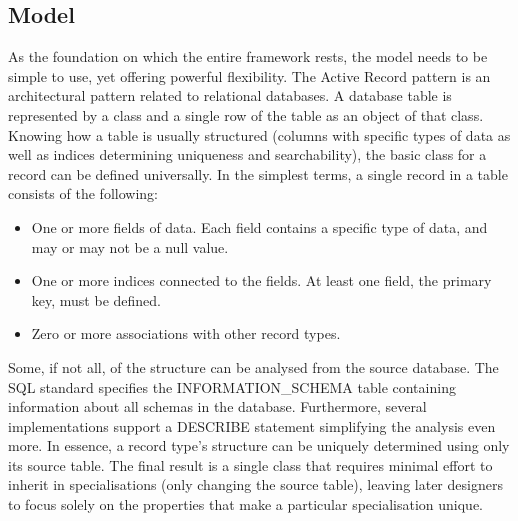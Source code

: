 
\subsection{Model}
\label{design_tech_model}
As the foundation on which the entire framework rests, the model needs to be simple to use, yet offering powerful flexibility. The Active Record pattern is an architectural pattern related to relational databases. A database table is represented by a class and a single row of the table as an object of that class. Knowing how a table is usually structured (columns with specific types of data as well as indices determining uniqueness and searchability), the basic class for a record can be defined universally.
In the simplest terms, a single record in a table consists of the following:
\begin{itemize}
    \item One or more fields of data. Each field contains a specific type of data, and may or may not be a null value.
    \item One or more indices connected to the fields. At least one field, the primary key, must be defined.
    \item Zero or more associations with other record types.
\end{itemize}
Some, if not all, of the structure can be analysed from the source database. The SQL standard specifies the INFORMATION\_SCHEMA table containing information about all schemas in the database. Furthermore, several implementations support a DESCRIBE statement simplifying the analysis even more. In essence, a record type's structure can be uniquely determined using only its source table.
The final result is a single class that requires minimal effort to inherit in specialisations (only changing the source table), leaving later designers to focus solely on the properties that make a particular specialisation unique.

